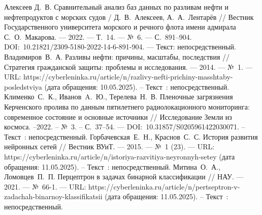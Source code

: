 
\begin{thebibliography}{99}

	  Алексеев Д.~В. Сравнительный анализ баз данных по разливам нефти и нефтепродуктов с морских судов / Д.~В.~Алексеев, А.~А.~Лентарёв // Вестник Государственного университета морского и речного флота имени адмирала С.~О.~Макарова. — 2022. — Т.~14. — №~6. — С.~891–904. DOI:~10.21821/2309-5180-2022-14-6-891-904. — Текст: непосредственный.
     Владимиров~В.~А. Разливы нефти: причины, масштабы, последствия // Стратегия гражданской защиты: проблемы и исследования. — 2014. — №~1. — URL: https://cyberleninka.ru/article/n/razlivy-nefti-prichiny-masshtaby-posledstviya (дата обращения: 10.05.2025). – Текст~: непосредственный.
     Клименко~С.~К., Иванов~A.~Ю., Терелева~Н.~В. Пленочные загрязнения Керченского пролива по данным пятилетнего радиолокационного мониторинга: современное состояние и основные источники // Исследование Земли из космоса. –2022. – №~3. – С.~37–54. — DOI:~10.31857/S0205961422030071. – Текст~: непосредственный.
    	Горбачевская~Е.~Н., Краснов~С.~С. История развития нейронных сетей  // Вестник ВУиТ.  — 2015. — №~1 (23). — URL: https://cyberleninka.ru/article/n/istoriya-razvitiya-neyronnyh-setey (дата обращения: 11.05.2025).  – Текст~: непосредственный.
	Митина~О.~А., Ломовцев~П.~П. Перцептрон в задачах бинарной классификации // НАУ. — 2021. — №~66-1. — URL: https://cyberleninka.ru/article/n/pertseptron-v-zadachah-binarnoy-klassifikatsii (дата обращения: 11.05.2025). – Текст~: непосредственный.
\end{thebibliography}

